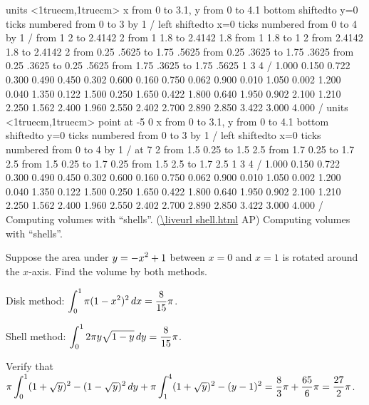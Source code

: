 \figure
\texonly
\vbox{\beginpicture
\normalgraphs
\ninepoint
\setcoordinatesystem units <1truecm,1truecm>
\setplotarea x from 0 to 3.1, y from 0 to 4.1
\axis bottom shiftedto y=0 ticks numbered from 0 to 3 by 1 /
\axis left shiftedto x=0 ticks numbered from 0 to 4 by 1 /
\putrule from 1 2 to 2.4142 2
\putrule from 1 1.8 to 2.4142 1.8
\putrule from 1 1.8 to 1 2
\putrule from 2.4142 1.8 to 2.4142 2
\putrule from 0.25 .5625 to 1.75 .5625
\putrule from 0.25 .3625 to 1.75 .3625
\putrule from 0.25 .3625 to 0.25 .5625
\putrule from 1.75 .3625 to 1.75 .5625
 1 3 4 /
\setquadratic
{} 1.000 0.150 0.722 0.300 0.490 0.450 0.302 0.600 0.160 
0.750 0.062 0.900 0.010 1.050 0.002 1.200 0.040 1.350 0.122 
1.500 0.250 1.650 0.422 1.800 0.640 1.950 0.902 2.100 1.210 
2.250 1.562 2.400 1.960 2.550 2.402 2.700 2.890 2.850 3.422 
3.000 4.000 /
\setcoordinatesystem units <1truecm,1truecm> point at -5 0
\setplotarea x from 0 to 3.1, y from 0 to 4.1
\axis bottom shiftedto y=0 ticks numbered from 0 to 3 by 1 /
\axis left shiftedto x=0 ticks numbered from 0 to 4 by 1 /
 at 7 2
\putrule from 1.5 0.25 to 1.5 2.5
\putrule from 1.7 0.25 to 1.7 2.5
\putrule from 1.5 0.25 to 1.7 0.25
\putrule from 1.5 2.5 to 1.7 2.5
\setlinear
{} 1 3 4 /
\setquadratic
{} 1.000 0.150 0.722 0.300 0.490 0.450 0.302 0.600 0.160 
0.750 0.062 0.900 0.010 1.050 0.002 1.200 0.040 1.350 0.122 
1.500 0.250 1.650 0.422 1.800 0.640 1.950 0.902 2.100 1.210 
2.250 1.562 2.400 1.960 2.550 2.402 2.700 2.890 2.850 3.422 
3.000 4.000 /
\endpicture}
\begincaption
Computing volumes with ``shells''.
(\expandafter\url\expandafter{\liveurl shell.html}%
AP\endurl)
\endcaption
\endtexonly
{}
\htmlonly
\begincaption
Computing volumes with ``shells''.
\endcaption
\endhtmlonly
\endfigure

\example Suppose the area under $\displaystyle y=-x^2+1$ between $x=0$ and $x=1$ is
rotated around the $x$-axis. Find the volume by both methods.

\msk
Disk method: $\displaystyle \int_0^1 \pi(1-x^2)^2\,dx={8\over15}\pi$.

\msk
Shell method: $\displaystyle \int_0^1 2\pi y \sqrt{1-y}\,dy={8\over15}\pi$.
\endexample

\exercises

\exercise
Verify that $\displaystyle\pi\int_0^1 (1+\sqrt{y})^2-(1-\sqrt{y})^2\,dy+
\pi\int_1^4  (1+\sqrt{y})^2-(y-1)^2={8\over3}\pi + {65\over6}\pi
={27\over2}\pi$.
\endexercise

